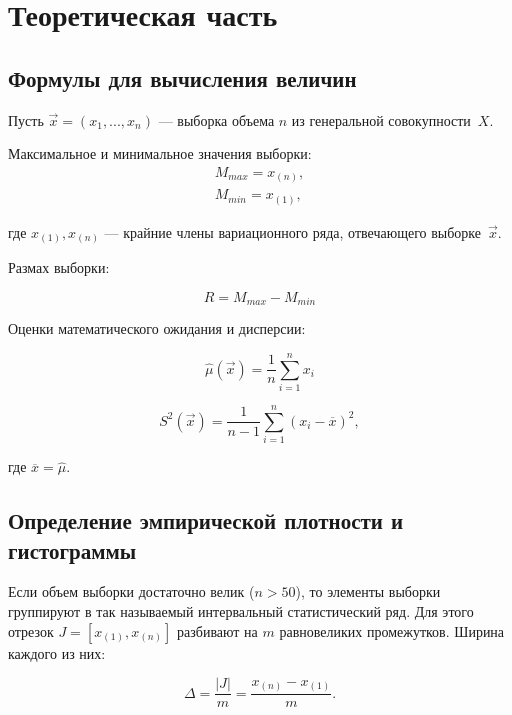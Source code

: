 \chapter{Теоретическая часть}

\section{Формулы для вычисления величин}

Пусть $\vec{x} = (x_1, ..., x_n)$ --- выборка объема $n$ из генеральной
совокупности~$X$.

Максимальное и минимальное значения выборки:
\begin{equation}\label{eq:01}
    \begin{aligned}
        M_{max} = x_{(n)},\\
        M_{min} = x_{(1)},
    \end{aligned}
\end{equation}

где $x_{(1)}, x_{(n)}$ --- крайние члены вариационного ряда, отвечающего
выборке~$\vec{x}$.

Размах выборки:

\begin{equation}\label{eq:03}
    R = M_{max} - M_{min}
\end{equation}

Оценки математического ожидания и дисперсии:

\begin{equation}\label{eq:04}
    \hat{\mu}(\vec{x}) = \frac{1}{n}\sum_{i=1}^{n} x_i
\end{equation}

\begin{equation}\label{eq:05}
    S^2(\vec x) = \frac 1{n-1} \sum_{i=1}^n (x_i-\overline x)^2,
\end{equation}

где $\overline x = \hat \mu$.

\section{Определение эмпирической плотности и гистограммы}

Если объем выборки достаточно велик ($n > 50$), то элементы выборки группируют в
так называемый интервальный статистический ряд. Для этого отрезок $J=[x_{(1)},
x_{(n)}]$ разбивают на $m$ равновеликих промежутков. Ширина каждого из них:

\begin{equation}\label{eq:06}
    \Delta = \frac{|J|}{m} = \frac{x_{(n)} - x_{(1)}}{m}.
\end{equation}

